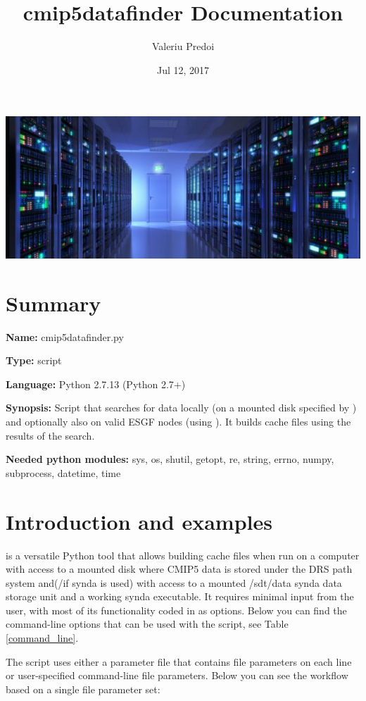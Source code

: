 \documentclass[letterpaper,10pt,english]{sphinxmanual}
\title{cmip5datafinder Documentation}
\author{Valeriu Predoi}
\date{Jul 12, 2017}
\begin{document}
\maketitle
\includegraphics[scale=1.0]{datas}

\section*{Summary}
\label{\detokenize{index:module-cmip5datafinder}}
\textbf{Name:} cmip5datafinder.py

\textbf{Type:} script

\textbf{Language:} Python 2.7.13 (Python 2.7+)

\textbf{Synopsis:} Script that searches for data locally (on a mounted disk specified by ) and optionally also on valid ESGF nodes (using ). It builds cache files using the results of the search.

\textbf{Needed python modules:} sys, os, shutil, getopt, re, string, errno, numpy, subprocess, datetime, time

\section*{Introduction and examples}

 is a versatile Python tool that allows building cache files when run on a computer with access to a mounted disk where CMIP5 data is stored under the DRS path system and(/if synda is used) with access to a mounted /sdt/data synda data storage unit and a working synda executable. It requires minimal input from the user, with most of its functionality coded in as options. Below you can find the command-line options that can be used with the script, see Table \ref{command_line}.

The script uses either a parameter file that contains file parameters on each line or user-specified command-line file parameters. Below you can see the workflow based on a single file parameter set:
\end{document}
